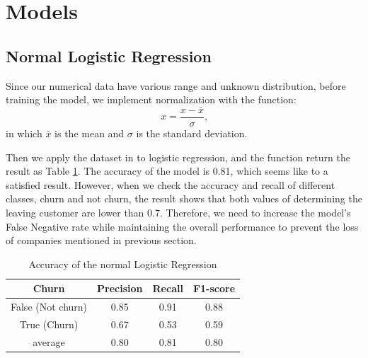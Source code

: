 \documentclass{article}
\begin{document}
\section{Models}
\subsection{Normal Logistic Regression}
Since our numerical data have various range and unknown distribution, before training the model, we implement normalization with the function:
\[x = \frac{x - \bar{x}}{\sigma}\texttt{,}\]
in which $\bar{x}$ is the mean and $\sigma$ is the standard deviation.
\vspace{5.5pt}

\noindent Then we apply the dataset in to logistic regression, and the function return the result as Table \ref{NLR}. The accuracy of the model is 0.81, which seems like to a satisfied result. However, when we check the accuracy and recall of different classes, churn and not churn, the result shows that both values of determining the leaving customer are lower than 0.7. Therefore, we need to increase the model’s False Negative rate while maintaining the overall performance to prevent the loss of companies mentioned in previous section.
\FloatBarrier
\begin{table}[htb]
\centering
\caption{Accuracy of the normal Logistic Regression}
	\begin{tabular}{||c c c c ||} 
	 \hline
 	Churn & Precision & Recall & F1-score  \\ [0.5ex] 
 	\hline\hline
 	False (Not churn) & 0.85 & 0.91 & 0.88 \\ 
 	True (Churn) & 0.67 & 0.53 & 0.59 \\
   	average & 0.80 & 0.81 & 0.80 \\
 	\hline
	\end{tabular}
\label{NLR}
\end{table}
\FloatBarrier
\end{document}
